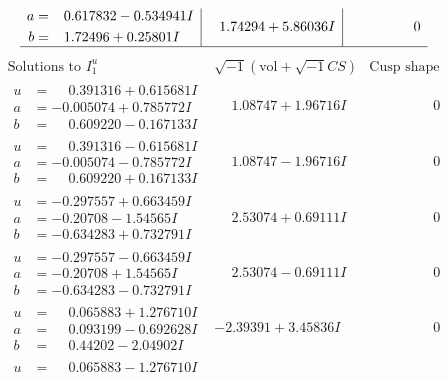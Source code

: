 \documentclass[1p]{elsarticle_modified}
\theoremstyle{definition}
\newcommand{\I}{\sqrt{-1}}
\begin{document}
$$\begin{array}{c|c|c}
\begin{aligned}
a &= \phantom{-}0.617832 - 0.534941 I \\
b &= \phantom{-}1.72496 + 0.25801 I\end{aligned}
 & \phantom{-}1.74294 + 5.86036 I & \phantom{-0.000000 } 0\\
 \hline 
 \end{array}$$\newpage$$\begin{array}{c|c|c}  
\text{Solutions to }I^u_{1}& \I (\text{vol} + \sqrt{-1}CS) & \text{Cusp shape}\\
 \hline 
\begin{aligned}
u &= \phantom{-}0.391316 + 0.615681 I \\
a &= -0.005074 + 0.785772 I \\
b &= \phantom{-}0.609220 - 0.167133 I\end{aligned}
 & \phantom{-}1.08747 + 1.96716 I & \phantom{-0.000000 } 0 \\ \hline\begin{aligned}
u &= \phantom{-}0.391316 - 0.615681 I \\
a &= -0.005074 - 0.785772 I \\
b &= \phantom{-}0.609220 + 0.167133 I\end{aligned}
 & \phantom{-}1.08747 - 1.96716 I & \phantom{-0.000000 } 0 \\ \hline\begin{aligned}
u &= -0.297557 + 0.663459 I \\
a &= -0.20708 - 1.54565 I \\
b &= -0.634283 + 0.732791 I\end{aligned}
 & \phantom{-}2.53074 + 0.69111 I & \phantom{-0.000000 } 0 \\ \hline\begin{aligned}
u &= -0.297557 - 0.663459 I \\
a &= -0.20708 + 1.54565 I \\
b &= -0.634283 - 0.732791 I\end{aligned}
 & \phantom{-}2.53074 - 0.69111 I & \phantom{-0.000000 } 0 \\ \hline\begin{aligned}
u &= \phantom{-}0.065883 + 1.276710 I \\
a &= \phantom{-}0.093199 - 0.692628 I \\
b &= \phantom{-}0.44202 - 2.04902 I\end{aligned}
 & -2.39391 + 3.45836 I & \phantom{-0.000000 } 0 \\ \hline\begin{aligned}
u &= \phantom{-}0.065883 - 1.276710 I \\

\end{aligned}
\end{array}$$
\end{document}
